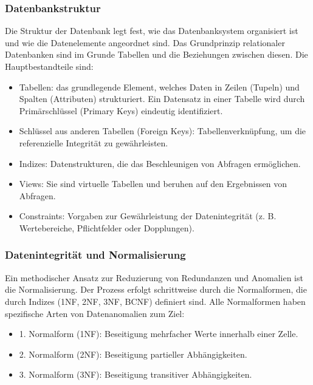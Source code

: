 \subsubsection{Datenbankstruktur}

Die Struktur der Datenbank legt fest, wie das Datenbanksystem organisiert ist und wie die Datenelemente angeordnet sind.
Das Grundprinzip relationaler Datenbanken sind im Grunde Tabellen und die Beziehungen zwischen diesen.
Die Hauptbestandteile sind: \cite*[35]{Gadatsch2019}

\begin{itemize}
\item Tabellen: das grundlegende Element, welches Daten in Zeilen (Tupeln) und Spalten (Attributen) strukturiert.
 Ein Datensatz in einer Tabelle wird durch Primärschlüssel (Primary Keys) eindeutig identifiziert.
\item Schlüssel aus anderen Tabellen (Foreign Keys): Tabellenverknüpfung, um die referenzielle Integrität zu gewährleisten.
\item Indizes: Datenstrukturen, die das Beschleunigen von Abfragen ermöglichen.
\item Views: Sie sind virtuelle Tabellen und beruhen auf den Ergebnissen von Abfragen.
\item Constraints: Vorgaben zur Gewährleistung der Datenintegrität (z. B. Wertebereiche, Pflichtfelder oder Dopplungen).
\end{itemize}
\textit{%
}\subsubsection{Datenintegrität und Normalisierung}
\textit{%
}Ein methodischer Ansatz zur Reduzierung von Redundanzen und Anomalien ist die Normalisierung.
Der Prozess erfolgt schrittweise durch die Normalformen, die durch Indizes (1NF, 2NF, 3NF, BCNF) definiert sind.
Alle Normalformen haben spezifische Arten von Datenanomalien zum Ziel: \cite*[38-41]{Gadatsch2019}

\begin{itemize}

\item 1. Normalform (1NF): Beseitigung mehrfacher Werte innerhalb einer Zelle.
\item 2. Normalform (2NF): Beseitigung partieller Abhängigkeiten.
\item 3. Normalform (3NF): Beseitigung transitiver Abhängigkeiten.

\end{itemize}

